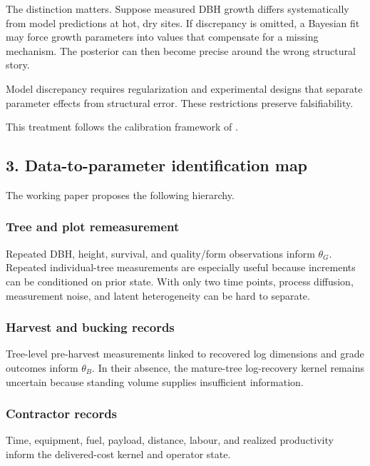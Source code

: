 The distinction matters. Suppose measured DBH growth differs systematically
from model predictions at hot, dry sites. If discrepancy is omitted, a Bayesian
fit may force growth parameters into values that compensate for a missing
mechanism. The posterior can then become precise around the wrong structural
story.

Model discrepancy requires regularization and experimental designs that separate
parameter effects from structural error. These restrictions preserve
falsifiability.

This treatment follows the calibration framework of \citet{kennedy2001calibration}.

\subsection{3. Data-to-parameter identification map}\label{data-to-parameter-identification-map}

The working paper proposes the following hierarchy.

\subsubsection{Tree and plot remeasurement}\label{tree-and-plot-remeasurement}

Repeated DBH, height, survival, and quality/form observations inform
$\theta_G$. Repeated individual-tree measurements are especially useful because
increments can be conditioned on prior state. With only two time points, process
diffusion, measurement noise, and latent heterogeneity can be hard to separate.

\subsubsection{Harvest and bucking records}\label{harvest-and-bucking-records}

Tree-level pre-harvest measurements linked to recovered log dimensions and grade
outcomes inform $\theta_B$. In their absence, the mature-tree log-recovery kernel
remains uncertain because standing volume supplies insufficient information.

\subsubsection{Contractor records}\label{contractor-records}

Time, equipment, fuel, payload, distance, labour, and realized productivity
inform the delivered-cost kernel and operator state.

